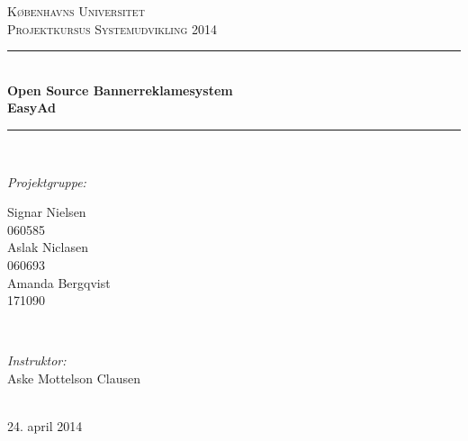 \documentclass[a4paper,12pt]{article}
\begin{document}
\begin{titlepage}


\newcommand{\HRule}{\rule{\linewidth}{0.5mm}} %

\center %

\textsc{\LARGE Københavns Universitet}\\[1.5cm] %
\textsc{\Large Projektkursus Systemudvikling 2014}\\[0.5cm] %

\HRule \\[0.4cm]
{  \bfseries \large Open Source Bannerreklamesystem \\ \huge EasyAd}\\[0.4cm] %
\HRule \\[1.5cm]

\begin{minipage}[t]{0.4\textwidth}
\begin{flushleft} \large
\emph{Projektgruppe:}


Signar Nielsen %
\\
060585
\newline
\\
Aslak Niclasen
\\
060693
\newline
\\
Amanda Bergqvist
\\
171090
\end{flushleft}
\end{minipage}
~
\begin{minipage}[t]{0.4\textwidth}
\begin{flushright} \large
\emph{Instruktor:} \\
Aske Mottelson Clausen %
\end{flushright}
\end{minipage}\\[4cm]

{\large 24. april 2014}\\[3cm] %

\end{titlepage}

\tableofcontents %


\clearpage %
\end{document}
